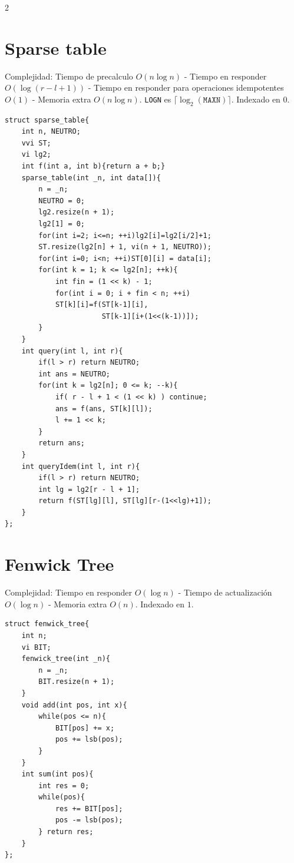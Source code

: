 \documentclass[10pt,spanish,mexico]{article}
\numberwithin{equation}{section}
\begin{document}
\begin{multicols}{2}
\vspace{-1.2\baselineskip}
\hrulefill
\section{Sparse table}
Complejidad: Tiempo de precalculo $O(n\log n)$ - Tiempo en responder $O(\log (r - l + 1))$ - Tiempo en responder para operaciones idempotentes $O(1)$ - Memoria extra $O(n\log n)$. \texttt{LOGN} es $\lceil \log_2(\texttt{MAXN}) \rceil$. Indexado en $0$.
\begin{verbatim}
struct sparse_table{
    int n, NEUTRO;
    vvi ST;
    vi lg2;
    int f(int a, int b){return a + b;}
    sparse_table(int _n, int data[]){
        n = _n;
        NEUTRO = 0;
        lg2.resize(n + 1);
        lg2[1] = 0;
        for(int i=2; i<=n; ++i)lg2[i]=lg2[i/2]+1;
        ST.resize(lg2[n] + 1, vi(n + 1, NEUTRO));
        for(int i=0; i<n; ++i)ST[0][i] = data[i];
        for(int k = 1; k <= lg2[n]; ++k){
            int fin = (1 << k) - 1;
            for(int i = 0; i + fin < n; ++i)
            ST[k][i]=f(ST[k-1][i],
                       ST[k-1][i+(1<<(k-1))]);
        }
    }
    int query(int l, int r){
        if(l > r) return NEUTRO;
        int ans = NEUTRO;
        for(int k = lg2[n]; 0 <= k; --k){
            if( r - l + 1 < (1 << k) ) continue;
            ans = f(ans, ST[k][l]);
            l += 1 << k;
        }
        return ans;
    }
    int queryIdem(int l, int r){
        if(l > r) return NEUTRO;
        int lg = lg2[r - l + 1];
        return f(ST[lg][l], ST[lg][r-(1<<lg)+1]);
    }
};
\end{verbatim}

\vspace{-1.2\baselineskip}
\hrulefill
\section{Fenwick Tree}
Complejidad: Tiempo en responder $O(\log n)$ - Tiempo de actualización $O(\log n)$ - Memoria extra $O(n)$. Indexado en $1$.
\begin{verbatim}
struct fenwick_tree{
    int n;
    vi BIT;
    fenwick_tree(int _n){
        n = _n;
        BIT.resize(n + 1);
    }
    void add(int pos, int x){
        while(pos <= n){
            BIT[pos] += x;
            pos += lsb(pos);
        }
    }
    int sum(int pos){
        int res = 0;
        while(pos){
            res += BIT[pos];
            pos -= lsb(pos);
        } return res;
    }
};
\end{verbatim}


\end{multicols}
\end{document}

